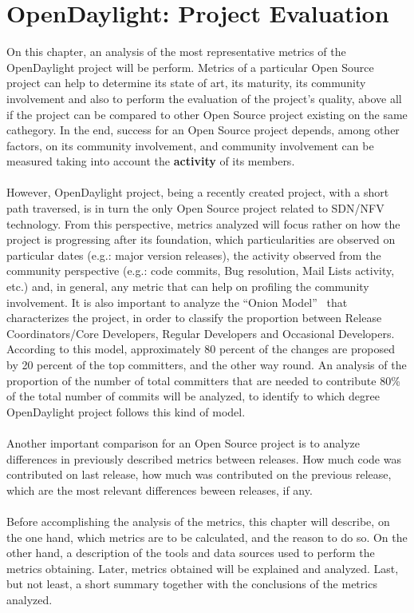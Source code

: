 \documentclass[a4paper, 12pt]{book}
\begin{document}
\chapter{OpenDaylight: Project Evaluation}
\label{chap:odlprojeval}
On this chapter, an analysis of the most representative metrics of the OpenDaylight project will be perform. Metrics of a particular Open Source project can help to determine its state of art, its maturity, its community involvement and also to perform the evaluation of the project's quality, above all if the project can be compared to other Open Source project existing on the same cathegory. In the end, success for an Open Source project depends, among other factors, on its community involvement, and community involvement can be measured taking into account the \textbf{activity} of its members.\\
\\
However, OpenDaylight project, being a recently created project, with a short path traversed, is in turn the only Open Source project related to SDN/NFV technology. From this perspective, metrics analyzed will focus rather on how the project is progressing after its foundation, which particularities are observed on particular dates (e.g.: major version releases), the activity observed from the community perspective (e.g.: code commits, Bug resolution, Mail Lists activity, etc.) and, in general, any metric that can help on profiling the community involvement. It is also important to analyze the ``Onion Model''~\cite{OpenSourceSocialStructure} that characterizes the project, in order to classify the proportion between Release Coordinators/Core Developers, Regular Developers and Occasional Developers. According to this model, approximately 80 percent of the changes are proposed by 20 percent of the top committers, and the other way round. An analysis of the proportion of the number of total committers that are needed to contribute 80\% of the total number of commits will be analyzed, to identify to which degree OpenDaylight project follows this kind of model.\\
\\
Another important comparison for an Open Source project is to analyze differences in previously described metrics between releases. How much code was contributed on last release, how much was contributed on the previous release, which are the most relevant differences beween releases, if any.\\
\\
Before accomplishing the analysis of the metrics, this chapter will describe, on the one hand, which metrics are to be calculated, and the reason to do so. On the other hand, a description of the tools and data sources used to perform the metrics obtaining. Later, metrics obtained will be explained and analyzed. Last, but not least, a short summary together with the conclusions of the metrics analyzed.
\end{document}
